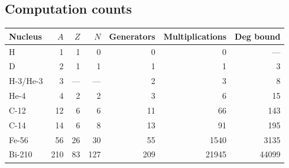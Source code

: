 \documentclass[12pt,a4paper]{article}
\begin{document}
\subsection*{Computation counts}

\begin{tabular}{@{} l r r r r r r @{}}
\toprule
\textbf{Nucleus} & $A$ & $Z$ & $N$
  & \textbf{Generators} & \textbf{Multiplications}
  & \textbf{Deg bound} \\
\midrule
H       &   1 &  1 &   0 &   0 &       0 & --- \\
D       &   2 &  1 &   1 &   1 &       1 &   3 \\
H-3/He-3 & 3 & --- & --- &   2 &       3 &   8 \\
He-4    &   4 &  2 &   2 &   3 &       6 &  15 \\
C-12    &  12 &  6 &   6 &  11 &      66 & 143 \\
C-14    &  14 &  6 &   8 &  13 &      91 & 195 \\
Fe-56   &  56 & 26 &  30 &  55 &   1540 & 3135 \\
Bi-210  & 210 & 83 & 127 & 209 &  21945 & 44099 \\
\bottomrule
\end{tabular}
\end{document}
